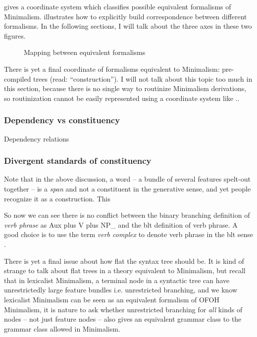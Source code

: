 \documentclass[../main.tex]{subfiles}
\begin{document}
 gives a coordinate system which classifies possible equivalent formalisms
of Minimalism.  illustrates how to explicitly build correspondence between 
different formalisms. In the following sections, I will talk about the three axes in these two figures. 

\begin{figure}
    \centering
    
    \caption{Mapping between equivalent formalisms}
    \label{fig:minimalism-mapping}
\end{figure}

There is yet a final coordinate of formalisms equivalent to Minimalism: pre-compiled trees 
(read: ``construction''). I will not talk about this topic too much in this section, because there is no 
single way to routinize Minimalism derivations, so routinization cannot be easily represented 
using a coordinate system like .. 

\subsubsection{Dependency vs constituency}\label{sec:minimalist-dependency}

Dependency relations

\subsubsection{Divergent standards of constituency}

Note that in the above discussion, a word -- a bundle of several features spelt-out together -- is a \emph{span}
and not a constituent in the generative sense, and yet people recognize it as a construction. This %

So now we can see there is no conflict between the binary branching definition of \emph{verb phrase} as Aux plus V plus NP_{} and the \ac{blt} definition of verb phrase. A good choice is to use the term 
\emph{verb complex} to denote verb phrase in the \ac{blt} sense \citep{Wilbur2014}.

There is yet a final issue about how flat the syntax tree should be. It is kind of strange to talk about 
flat trees in a theory equivalent to Minimalism, but recall that in lexicalist Minimalism, a terminal node 
in a syntactic tree can have unrestrictedly large feature bundles i.e. unrestricted branching, and 
we know lexicalist Minimalism can be seen as an equivalent formalism of OFOH Minimalism, it is nature 
to ask whether unrestricted branching for \emph{all} kinds of nodes -- not just feature nodes -- also gives 
an equivalent grammar class to the grammar class allowed in Minimalism.
\end{document}
